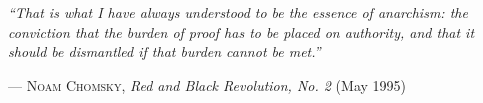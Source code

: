 \clearpage
\begin{flushright}
    \mbox{}\vfill
    \begin{minipage}{0.49\textwidth}
        \justifying
        \noindent
        {\itshape
        ``That is what I have always understood to
        be the essence of anarchism: the conviction
        that the burden of proof has to be placed on 
        authority, and that it should be dismantled 
        if that burden cannot be met.''\\
        }
        
        \raggedleft
        \parbox{\linewidth}{--- \textsc{Noam Chomsky,} \textit{Red and Black Revolution, No. 2} (May 1995)}
    \end{minipage}
\end{flushright}
